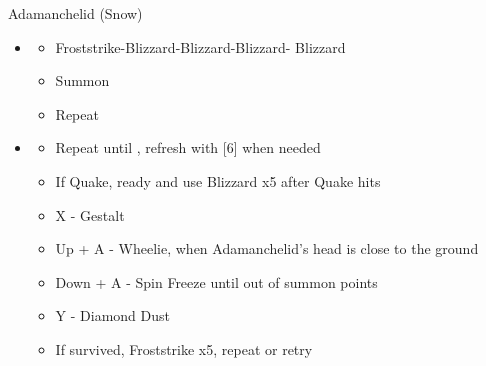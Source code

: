 \begin{battle}[0:54]{Adamanchelid (Snow)}
	\begin{itemize}
		\item \sixth
		      \begin{itemize}
			      \item Froststrike-Blizzard-Blizzard-Blizzard- Blizzard
			      \item Summon
			      \item Repeat
		      \end{itemize}
		\item \fifth
		      \begin{itemize}
			      \item Repeat until \stagger, refresh with [6] when needed
			      \item If Quake, ready and use Blizzard x5 after Quake hits
			      \item X - Gestalt
			      \item Up + A - Wheelie, when Adamanchelid's head is close to the ground
			      \item Down + A - Spin Freeze until out of summon points
			      \item Y - Diamond Dust
			      \item If survived, Froststrike x5, repeat or retry
		      \end{itemize}
	\end{itemize}
\end{battle}

